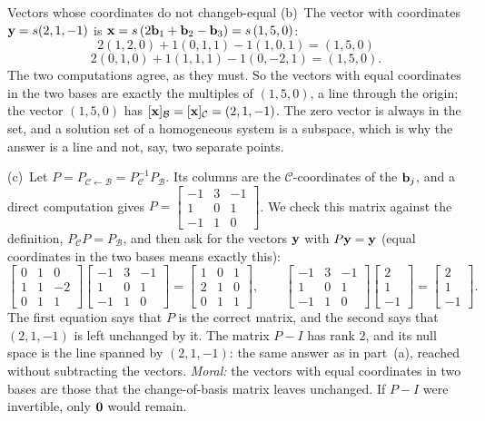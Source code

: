 \documentclass[11pt]{article}
\begin{document}
\begin{exmp}{Vectors whose coordinates do not change}{b-equal}
(b)~The vector with coordinates $\mathbf{y}=s(2,1,-1)$ is $\mathbf{x}=s\,(2\mathbf{b}_1+\mathbf{b}_2-\mathbf{b}_3)=s\,(1,5,0)$:
\[
2(1,2,0)+1(0,1,1)-1(1,0,1)=(1,5,0)
\]
\[
2(0,1,0)+1(1,1,1)-1(0,-2,1)=(1,5,0).
\]
The two computations agree, as they must. So the vectors with equal coordinates in the two bases are exactly the multiples of $(1,5,0)$, a line through the origin; the vector $(1,5,0)$ has $[\mathbf{x}]_{\mathcal{B}}=[\mathbf{x}]_{\mathcal{C}}=(2,1,-1)$. The zero vector is always in the set, and a solution set of a homogeneous system is a subspace, which is why the answer is a line and not, say, two separate points.

(c)~Let $P=P_{\mathcal{C}\leftarrow\mathcal{B}}=P_{\mathcal{C}}^{-1}P_{\mathcal{B}}$. Its columns are the $\mathcal{C}$-coordinates of the $\mathbf{b}_j$, and a direct computation gives $P=\begin{bmatrix}-1&3&-1\\1&0&1\\-1&1&0\end{bmatrix}$. We check this matrix against the definition, $P_{\mathcal{C}}P=P_{\mathcal{B}}$, and then ask for the vectors $\mathbf{y}$ with $P\mathbf{y}=\mathbf{y}$ (equal coordinates in the two bases means exactly this):
\[
\begin{bmatrix}0&1&0\\1&1&-2\\0&1&1\end{bmatrix}\begin{bmatrix}-1&3&-1\\1&0&1\\-1&1&0\end{bmatrix}=\begin{bmatrix}1&0&1\\2&1&0\\0&1&1\end{bmatrix},\qquad
\begin{bmatrix}-1&3&-1\\1&0&1\\-1&1&0\end{bmatrix}\begin{bmatrix}2\\1\\-1\end{bmatrix}=\begin{bmatrix}2\\1\\-1\end{bmatrix}.
\]
The first equation says that $P$ is the correct matrix, and the second says that $(2,1,-1)$ is left unchanged by it. The matrix $P-I$ has rank $2$, and its null space is the line spanned by $(2,1,-1)$: the same answer as in part~(a), reached without subtracting the vectors. \emph{Moral:} the vectors with equal coordinates in two bases are those that the change-of-basis matrix leaves unchanged. If $P-I$ were invertible, only $\mathbf{0}$ would remain.
\end{exmp}
\end{document}
